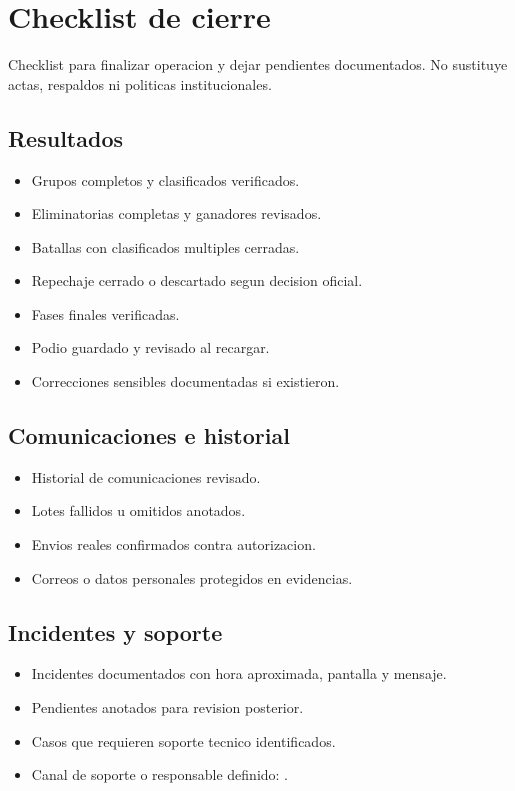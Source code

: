 \chapter{Checklist de cierre}
\label{anexo:checklist-cierre}

Checklist para finalizar operacion y dejar pendientes documentados. No sustituye actas, respaldos ni politicas institucionales.

\section*{Resultados}
\begin{itemize}
    \item[\casilla] Grupos completos y clasificados verificados.
    \item[\casilla] Eliminatorias completas y ganadores revisados.
    \item[\casilla] Batallas con clasificados multiples cerradas.
    \item[\casilla] Repechaje cerrado o descartado segun decision oficial.
    \item[\casilla] Fases finales verificadas.
    \item[\casilla] Podio guardado y revisado al recargar.
    \item[\casilla] Correcciones sensibles documentadas si existieron.
\end{itemize}

\section*{Comunicaciones e historial}
\begin{itemize}
    \item[\casilla] Historial de comunicaciones revisado.
    \item[\casilla] Lotes fallidos u omitidos anotados.
    \item[\casilla] Envios reales confirmados contra autorizacion.
    \item[\casilla] Correos o datos personales protegidos en evidencias.
\end{itemize}

\section*{Incidentes y soporte}
\begin{itemize}
    \item[\casilla] Incidentes documentados con hora aproximada, pantalla y mensaje.
    \item[\casilla] Pendientes anotados para revision posterior.
    \item[\casilla] Casos que requieren soporte tecnico identificados.
    \item[\casilla] Canal de soporte o responsable definido: .
\end{itemize}

